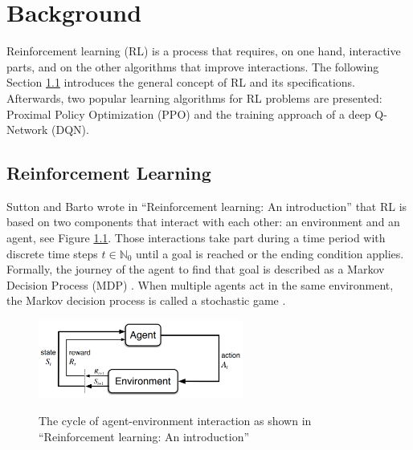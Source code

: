\chapter{Background}\label{sec:Background}
Reinforcement learning (RL) is a process that requires, on one hand, interactive parts, and on the other algorithms that improve interactions. The following Section \ref{reinforcement_learning} introduces the general concept of RL and its specifications. Afterwards, two popular learning algorithms for RL problems are presented: Proximal Policy Optimization (PPO) and the training approach of a deep Q-Network (DQN).

\section{Reinforcement Learning}\label{reinforcement_learning}
Sutton and Barto wrote in ``Reinforcement learning: An introduction'' \cite{suba18} that RL is based on two components that interact with each other: an environment and an agent, see Figure \ref{fig:rl_cycle}. Those interactions take part during a time period with discrete time steps $t\in\mathbb{N}_0$ until a goal is reached or the ending condition applies. Formally, the journey of the agent to find that goal is described as a Markov Decision Process (MDP) \cite{suba18}. 
When multiple agents act in the same environment, the Markov decision process is called a stochastic game \cite{buba10}.
\begin{figure}[hpbt]
    \centering
    \includegraphics[width=0.6\textwidth]{pictures/RLInteractionSB}\\
    \caption[Reinforcement Learning Cycle]{The cycle of agent-environment interaction as
        shown in ``Reinforcement learning: An introduction'' \cite{suba18}}\label{fig:rl_cycle}
\end{figure}

